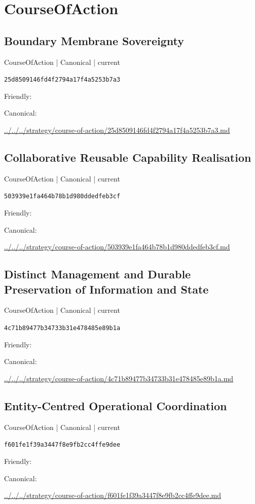 \documentclass[10pt,a4paper]{article}
\begin{document}
\section*{CourseOfAction}
\subsection*{Boundary Membrane Sovereignty}
{\small CourseOfAction | Canonical | current}\par
\texttt{25d8509146fd4f2794a17f4a5253b7a3}\par
Friendly: \par
Canonical: \par
{\footnotesize\url{../../../strategy/course-of-action/25d8509146fd4f2794a17f4a5253b7a3.md}}\par
\subsection*{Collaborative Reusable Capability Realisation}
{\small CourseOfAction | Canonical | current}\par
\texttt{503939e1fa464b78b1d980ddedfeb3cf}\par
Friendly: \par
Canonical: \par
{\footnotesize\url{../../../strategy/course-of-action/503939e1fa464b78b1d980ddedfeb3cf.md}}\par
\subsection*{Distinct Management and Durable Preservation of Information and State}
{\small CourseOfAction | Canonical | current}\par
\texttt{4c71b89477b34733b31e478485e89b1a}\par
Friendly: \par
Canonical: \par
{\footnotesize\url{../../../strategy/course-of-action/4c71b89477b34733b31e478485e89b1a.md}}\par
\subsection*{Entity-Centred Operational Coordination}
{\small CourseOfAction | Canonical | current}\par
\texttt{f601fe1f39a3447f8e9fb2cc4ffe9dee}\par
Friendly: \par
Canonical: \par
{\footnotesize\url{../../../strategy/course-of-action/f601fe1f39a3447f8e9fb2cc4ffe9dee.md}}\par
\end{document}
